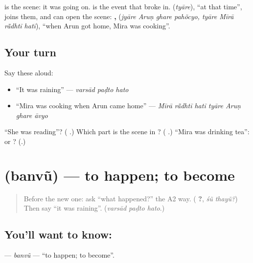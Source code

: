 \textbf{ } is the scene: it was going on. \textbf{} is the event that broke in. \textbf{} (\emph{tyāre}), \textquotedblleft{}at that time\textquotedblright{}, joins them, and \textbf{} can open the scene: \textbf{   ,    } (\emph{jyāre Aruṇ ghare pahõcyo, tyāre Mīrā rā̃dhtī hatī}), \textquotedblleft{}when Arun got home, Mira was cooking\textquotedblright{}.

\subsection*{Your turn}
Say these aloud:

\begin{itemize}
\raggedright
  \item \textquotedblleft{}It was raining\textquotedblright{} — \emph{varsād paḍto hato}
  \item \textquotedblleft{}Mira was cooking when Arun came home\textquotedblright{} — \emph{Mīrā rā̃dhtī hatī tyāre Aruṇ ghare āvyo}
\end{itemize}

\begin{tcolorbox}[breakable,colback=teal!4,colframe=teal!35!black,title={Before you move on}]
\textquotedblleft{}She was reading\textquotedblright{}? (\textbf{  }.) Which part is the scene in \textbf{     }? (\textbf{ }.) \textquotedblleft{}Mira was drinking tea\textquotedblright{}: \textbf{} or \textbf{}? (\textbf{}.)
\end{tcolorbox}
\section[\texorpdfstring{\gu{બનવું} (banvũ)}{બનવું (banvũ)}]{ (banvũ) — to happen; to become}

\label{lesson:GU-C275-banvu}



\begin{quote}
Before the new one: ask \textquotedblleft{}what happened?\textquotedblright{} the A2 way. (\textbf{ ?}, \emph{śũ thayũ?}) Then say \textquotedblleft{}it was raining\textquotedblright{}. (\emph{varsād paḍto hato}.)
\end{quote}

\subsection*{You'll want to know: }
\textbf{} — \emph{banvũ} — \textquotedblleft{}to happen; to become\textquotedblright{}.

